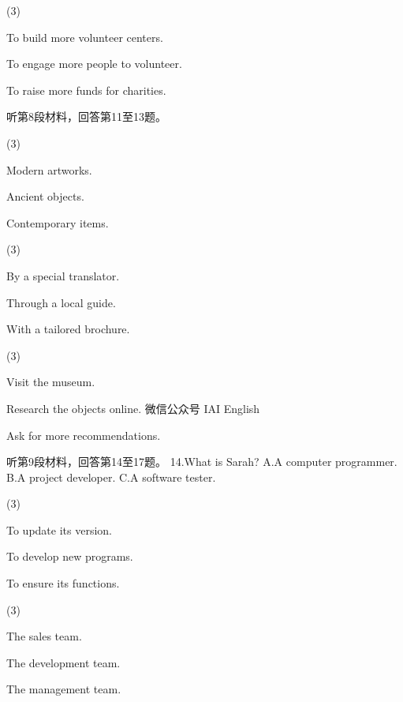 \documentclass{英语试卷}
\begin{document}
\begin{choices}(3)
  \item To build more volunteer centers.
  \item To engage more people to volunteer.
  \item To raise more funds for charities.
\end{choices}
\par 听第8段材料，回答第11至13题。\par
{}
\begin{choices}(3)
  \item Modern artworks.
  \item Ancient objects.
  \item Contemporary items.
\end{choices}
\begin{choices}(3)
  \item By a special translator.
  \item Through a local guide.
  \item With a tailored brochure.
\end{choices}
\begin{choices}(3)
  \item Visit the museum.
  \item Research the objects online. 微信公众号 IAI English
  \item Ask for more recommendations.
\end{choices}
\par 听第9段材料，回答第14至17题。 14.What is Sarah? A.A computer programmer. B.A project developer. C.A software tester.\par
{}
\begin{choices}(3)
  \item To update its version.
  \item To develop new programs.
  \item To ensure its functions.
\end{choices}
\begin{choices}(3)
  \item The sales team.
  \item The development team.
  \item The management team.
\end{choices}
\end{document}

